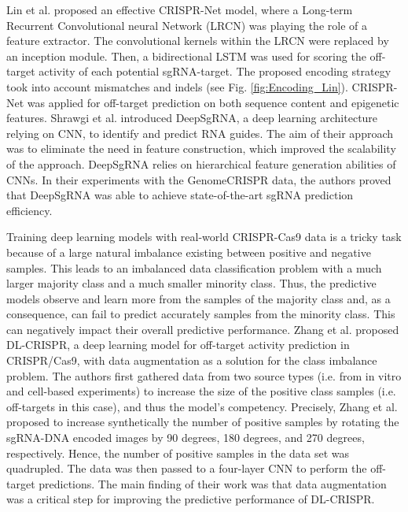 \documentclass[unnumsec,webpdf,contemporary,large]{oup-authoring-template}
\theoremstyle{thmstyleone}%
\theoremstyle{thmstyletwo}%
\theoremstyle{thmstylethree}%
\begin{document}
Lin et al. \cite{lin2020crispr} proposed an effective CRISPR-Net model, where a Long-term Recurrent Convolutional neural Network (LRCN) was playing the role of a feature extractor. The convolutional kernels within the LRCN were replaced by an inception module. Then, a bidirectional LSTM was used for scoring the off-target activity of each potential sgRNA-target. The proposed encoding strategy took into account mismatches and indels (see Fig. \ref{fig:Encoding_Lin}). CRISPR-Net was applied for off-target prediction on both sequence content and epigenetic features. Shrawgi et al. \cite{shrawgi2019convolution} introduced DeepSgRNA, a deep learning architecture relying on CNN, to identify and predict RNA guides. The aim of their approach was to eliminate the need in feature construction, which improved the scalability of the approach. DeepSgRNA relies on hierarchical feature generation abilities of CNNs. In their experiments with the GenomeCRISPR data, the authors proved that DeepSgRNA was able to achieve state-of-the-art sgRNA prediction efficiency.

Training deep learning models with real-world CRISPR-Cas9 data is a tricky task because of a large natural imbalance existing between positive and negative samples. This leads to an imbalanced data classification problem with a much larger majority class and a much smaller minority class. Thus, the predictive models observe and learn more from the samples of the majority class and, as a consequence, can fail to predict accurately samples from the minority class. This can negatively impact their overall predictive performance. Zhang et al. \cite{zhang2020dl} proposed DL-CRISPR, a deep learning model for off-target activity prediction in CRISPR/Cas9, with data augmentation as a solution for the class imbalance problem. The authors first gathered data from two source types (i.e. from in vitro and cell-based experiments) to increase the size of the positive class samples (i.e. off-targets in this case), and thus the model's competency. Precisely, Zhang et al. proposed to increase synthetically the number of positive samples by rotating the sgRNA-DNA encoded images by 90 degrees, 180 degrees, and 270 degrees, respectively. Hence, the number of positive samples in the data set was quadrupled. The data was then passed to a four-layer CNN to perform the off-target predictions. The main finding of their work was that data augmentation was a critical step for improving the predictive performance of DL-CRISPR.
\end{document}
